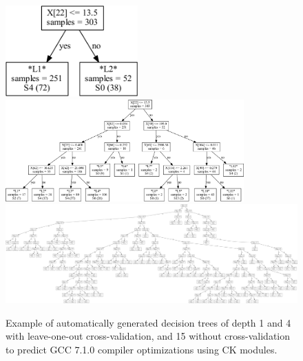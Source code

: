    \begin{figure}[!htbp]
     \centering
      \includegraphics[width=2in]
      {ck-assets/ca86d4d4daf1d84a-cropped.pdf} %
      \includegraphics[width=3.6in]
      {ck-assets/11a3f4efa4479adb-cropped.pdf} %
      \includegraphics[width=6.6in]
      {ck-assets/68deef9c2f07e734-cropped.pdf} %
     \caption{
      Example of automatically generated decision trees of depth 1 and 4 with leave-one-out cross-validation, 
      and 15 without cross-validation to predict GCC 7.1.0 compiler optimizations using CK modules.
     }
     \label{fig:ck-model-crowdtuning-gcc7-dt}
   \end{figure}

